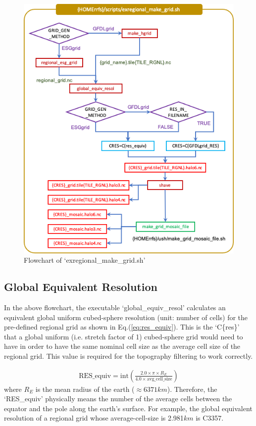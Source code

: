 \documentclass[11pt,fleqn]{report}              %
\begin{document}
\begin{figure}[ht!]
  \centering
  \includegraphics[width=0.6\linewidth]{FV3LAM_wflow_make_grid.png}
  \caption{Flowchart of `exregional\_make\_grid.sh' }
  \label{fig:wflow_make_grid}
\end{figure}



\subsection{Global Equivalent Resolution}
\label{subsec:global_eqv_res}

In the above flowchart, the executable `global\_equiv\_resol' calculates an equivalent global uniform cubed-sphere resolution (unit: number of cells) for the pre-defined regional grid as shown in Eq.(\ref{eq:res_equiv}). This is the `C\{res\}' that a global uniform (i.e. stretch factor of 1) cubed-sphere grid would need to have in order to have the same nominal cell size as the average cell size of the regional grid. This value is required for the topography filtering to work correctly.

\vspace{-0.3cm}

\begin{align}
\text{RES\_equiv} = \text{int} \left( \frac{2.0 \times \pi \times R_E}{4.0 \times \text{avg\_cell\_size}}  \right) 
\label{eq:res_equiv}
\end{align}
where $R_E$ is the mean radius of the earth ($\approx 6371 km$). Therefore, the `RES\_equiv' physically means the number of the average cells between the equator and  the pole along the earth's surface. For example, the global equivalent resolution of a regional grid whose average-cell-size is 2.981$km$ is C3357.
\end{document}
